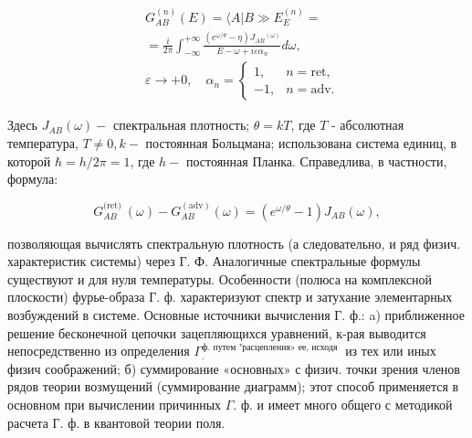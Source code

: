 \documentclass[10pt]{article}
\begin{document}
\[

\begin{aligned}

& G_{A B}^{(n)}(E)=\langle A| B \gg E{ }_{E}^{(n)}= \\

& =\frac{i}{2 \pi} \int_{-\infty}^{+\infty} \frac{\left(e^{\omega / \theta}-\eta\right) J_{A B}{ }^{(\omega)}}{E-\omega+i \varepsilon \alpha_{n}} d \omega, \\

& \varepsilon \longrightarrow+0, \quad \alpha_{n}=\left\{\begin{aligned}

1, & n=\mathrm{ret}, \\

-1, & n=\mathrm{adv} .

\end{aligned}\right.

\end{aligned}

\]



Здесь $J_{A B}(\omega)-$ спектральная плотность; $\theta=k T$, где $T$ - абсолютная температура, $T \neq 0, k-$ постоянная Больцмана; использована система единиц, в которой $\hbar=h / 2 \pi=1$, где $h-$ постоянная Планка. Справедлива, в частности, формула:



\[

G_{A B}^{(\text {ret) }}(\omega)-G_{A B}^{(\mathrm{adv})}(\omega)=\left(e^{\omega / \theta}-1\right) J_{A B}(\omega),

\]



позволяющая вычислять спектральную плотность (а следовательно, и ряд физич. характеристик системы) через Г. Ф. Аналогичные спектральные формулы существуют и для нуля температуры. Особенности (полюса на комплексной плоскости) фурье-образа Г. ф. характеризуют спектр и затухание элементарных возбуждений в системе. Основные источники вычисления Г. ф.: a) приближенное решение бесконечной цепочки зацепляющихся уравнений, к-рая выводится непосредственно из определения $\Gamma_{\text {. }}^{\text {ф. путем "расцепления» ее, исходя }}$ из тех или иных физич соображений; б) суммирование «основных» с физич. точки зрения членов рядов теории возмущений (суммирование диаграмм); этот способ применяется в основном при вычислении причинных $\Gamma$. ф. и имеет много общего с методикой расчета $Г$. ф. в квантовой теории поля.
\end{document}

